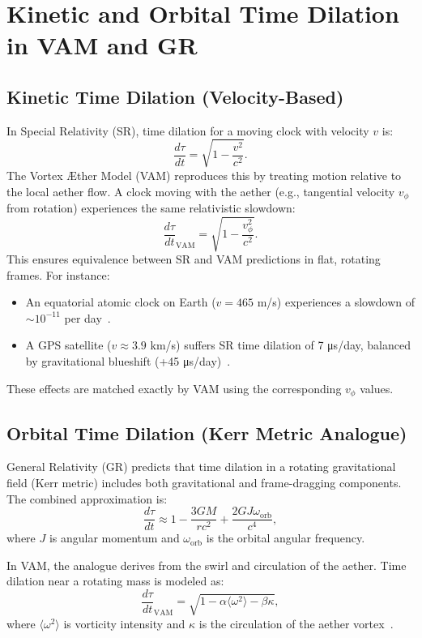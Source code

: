 \section{Kinetic and Orbital Time Dilation in VAM and GR}

\subsection{Kinetic Time Dilation (Velocity-Based)}

In Special Relativity (SR), time dilation for a moving clock with velocity $v$ is:
\[
    \frac{d\tau}{dt} = \sqrt{1 - \frac{v^2}{c^2}}.
\]
The Vortex Æther Model (VAM) reproduces this by treating motion relative to the local aether flow. A clock moving with the aether (e.g., tangential velocity $v_\phi$ from rotation) experiences the same relativistic slowdown:
\[
    \frac{d\tau}{dt}_{\text{VAM}} = \sqrt{1 - \frac{v_\phi^2}{c^2}}.
\]
This ensures equivalence between SR and VAM predictions in flat, rotating frames. For instance:
\begin{itemize}
    \item An equatorial atomic clock on Earth ($v=465$ m/s) experiences a slowdown of $\sim 10^{-11}$ per day~\cite{ashby2003relativity}.
    \item A GPS satellite ($v \approx 3.9$ km/s) suffers SR time dilation of 7 μs/day, balanced by gravitational blueshift (+45 μs/day)~\cite{ashby2003relativity}.
\end{itemize}
These effects are matched exactly by VAM using the corresponding $v_\phi$ values.

\subsection{Orbital Time Dilation (Kerr Metric Analogue)}

General Relativity (GR) predicts that time dilation in a rotating gravitational field (Kerr metric) includes both gravitational and frame-dragging components. The combined approximation is:
\[
    \frac{d\tau}{dt} \approx 1 - \frac{3GM}{rc^2} + \frac{2GJ\omega_{\text{orb}}}{c^4},
\]
where $J$ is angular momentum and $\omega_{\text{orb}}$ is the orbital angular frequency.

In VAM, the analogue derives from the swirl and circulation of the aether. Time dilation near a rotating mass is modeled as:
\[
    \frac{d\tau}{dt}_{\text{VAM}} = \sqrt{1 - \alpha \langle \omega^2 \rangle - \beta \kappa},
\]
where $\langle \omega^2 \rangle$ is vorticity intensity and $\kappa$ is the circulation of the aether vortex~\cite{iskandarani2025VAM2}.

